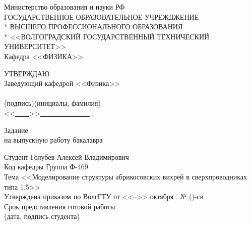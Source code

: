 \begin{titlepage}
	\begin{center}
		Министерство образования и науки РФ \\
		\vspace{.5cm}
		ГОСУДАРСТВЕННОЕ ОБРАЗОВАТЕЛЬНОЕ УЧРЕЖДЖЕНИЕ\\*
		ВЫСШЕГО ПРОФЕССИОНАЛЬНОГО ОБРАЗОВАНИЯ\\*
		<<ВОЛГОГРАДСКИЙ ГОСУДАРСТВЕННЫЙ ТЕХНИЧЕСКИЙ УНИВЕРСИТЕТ>>\\
		\vspace{.5cm}
		Кафедра <<ФИЗИКА>>
		\vspace{.5cm}
	\end{center}
\begin{flushright}
	УТВЕРЖДАЮ\\
	Заведующий кафедрой <<Физика>>\\
	\vspace{.3cm}
	\underline{\hspace{2cm}}\hspace{1cm}\underline{\hspace{4cm}}\\
	\vspace{-.2cm}\footnotesize(подпись)\hspace{1.8cm}(инициалы, фамилия)
		\hspace*{.2cm}\ \normalsize\\
	\vspace{.3cm}
	<<\underline{\ \ \ \ }>>\underline{\ \ \ \ \ \ \ \ \ \ \ \ \ \ } \the{}.
\end{flushright}
\begin{center}
	\large Задание \\
	\normalsize на выпускную работу бакалавра
\end{center}
\begin{flushleft}
Студент Голубев Алексей Владимирович\\
Код кафедры \underline{\hspace{3cm}}\hspace{6cm}Группа Ф-469\\
Тема <<Моделирование структуры абрикосовских вихрей в сверхпроводниках 
	типа 1.5>>\\
Утверждена приказом по ВолгГТУ от <<-->> октября \the{}. № ()-св\\
Срок представления готовой работы \underline{\hspace{6cm}}\\
\vspace{-.2cm}\hspace{9.5cm}\footnotesize(дата, подпись студента)\normalsize\\

\end{flushleft}
\end{titlepage}
